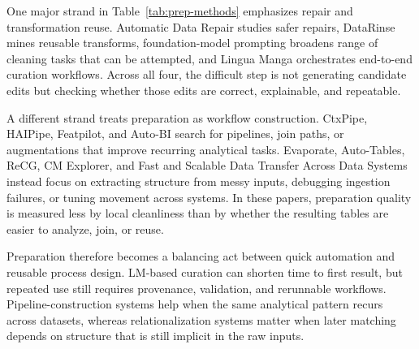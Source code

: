 \documentclass[sigconf]{acmart}
\begin{document}
One major strand in Table~\ref{tab:prep-methods} emphasizes repair and transformation reuse. Automatic Data Repair studies safer repairs, DataRinse mines reusable transforms, foundation-model prompting broadens range of cleaning tasks that can be attempted, and Lingua Manga orchestrates end-to-end curation workflows. Across all four, the difficult step is not generating candidate edits but checking whether those edits are correct, explainable, and repeatable.

A different strand treats preparation as workflow construction. CtxPipe, HAIPipe, Featpilot, and Auto-BI search for pipelines, join paths, or augmentations that improve recurring analytical tasks. Evaporate, Auto-Tables, ReCG, CM Explorer, and Fast and Scalable Data Transfer Across Data Systems instead focus on extracting structure from messy inputs, debugging ingestion failures, or tuning movement across systems. In these papers, preparation quality is measured less by local cleanliness than by whether the resulting tables are easier to analyze, join, or reuse.

Preparation therefore becomes a balancing act between quick automation and reusable process design. LM-based curation can shorten time to first result, but repeated use still requires provenance, validation, and rerunnable workflows. Pipeline-construction systems help when the same analytical pattern recurs across datasets, whereas relationalization systems matter when later matching depends on structure that is still implicit in the raw inputs.
\end{document}
